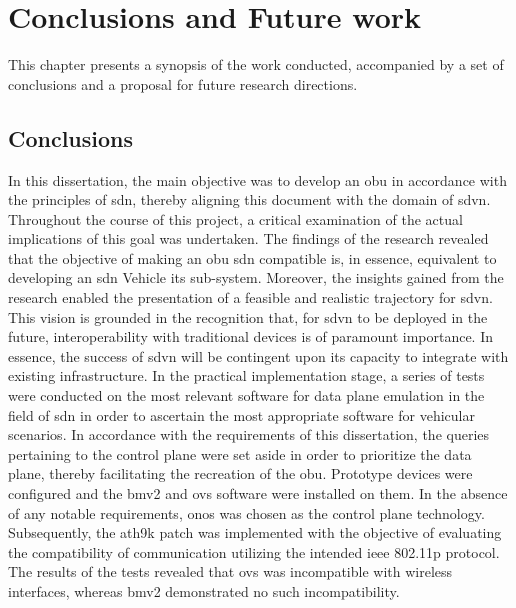 \chapter{Conclusions and Future work}
\label{cha:conclusion}

This chapter presents a synopsis of the work conducted, accompanied by a set of conclusions and a proposal for future research directions.

\section{Conclusions}
In this dissertation, the main objective was to develop an \gls{obu} in accordance with the principles of \gls{sdn}, thereby aligning this document with the domain of \gls{sdvn}. Throughout the course of this project, a critical examination of the actual implications of this goal was undertaken. The findings of the research revealed that the objective of making an \gls{obu} \gls{sdn} compatible is, in essence, equivalent to developing an \gls{sdn} Vehicle \gls{its} sub-system. Moreover, the insights gained from the research enabled the presentation of a feasible and realistic trajectory for \gls{sdvn}. This vision is grounded in the recognition that, for \gls{sdvn} to be deployed in the future, interoperability with traditional devices is of paramount importance. In essence, the success of \gls{sdvn} will be contingent upon its capacity to integrate with existing infrastructure.
In the practical implementation stage, a series of tests were conducted on the most relevant software for data plane emulation in the field of \gls{sdn} in order to ascertain the most appropriate software for vehicular scenarios. In accordance with the requirements of this dissertation, the queries pertaining to the control plane were set aside in order to prioritize the data plane, thereby facilitating the recreation of the \gls{obu}. 
Prototype devices were configured and the \gls{bmv2} and \gls{ovs} software were installed on them. In the absence of any notable requirements, \gls{onos} was chosen as the control plane technology. Subsequently, the ath9k patch was implemented with the objective of evaluating the compatibility of communication utilizing the intended \gls{ieee} 802.11p protocol. The results of the tests revealed that \gls{ovs} was incompatible with wireless interfaces, whereas \gls{bmv2} demonstrated no such incompatibility.
